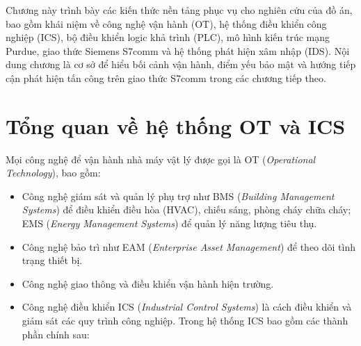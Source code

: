 \documentclass[../main.tex]{subfiles}
\begin{document}
Chương này trình bày các kiến thức nền tảng phục vụ cho nghiên cứu của đồ án, bao gồm khái niệm về công nghệ vận hành (OT), hệ thống điều khiển công nghiệp (ICS), bộ điều khiển logic khả trình (PLC), mô hình kiến trúc mạng Purdue, giao thức Siemens S7comm và hệ thống phát hiện xâm nhập (IDS). Nội dung chương là cơ sở để hiểu bối cảnh vận hành, điểm yếu bảo mật và hướng tiếp cận phát hiện tấn công trên giao thức S7comm trong các chương tiếp theo.

\section{Tổng quan về hệ thống OT và ICS}
\label{sec:ot-ics}

Mọi công nghệ để vận hành nhà máy vật lý được gọi là OT (\textit{Operational Technology}), bao gồm:

\begin{itemize}
    \item Công nghệ giám sát và quản lý phụ trợ như BMS (\textit{Building Management Systems}) để điều khiển điều hòa (HVAC), chiếu sáng, phòng cháy chữa cháy; EMS (\textit{Energy Management Systems}) để quản lý năng lượng tiêu thụ.
    \item Công nghệ bảo trì như EAM (\textit{Enterprise Asset Management}) để theo dõi tình trạng thiết bị.
    \item Công nghệ giao thông và điều khiển vận hành hiện trường.
    \item Công nghệ điều khiển ICS (\textit{Industrial Control Systems}) là cách điều khiển và giám sát các quy trình công nghiệp. Trong hệ thống ICS bao gồm các thành phần chính sau:
\end{itemize}

\begin{center}
    \end{center}
\end{document}
